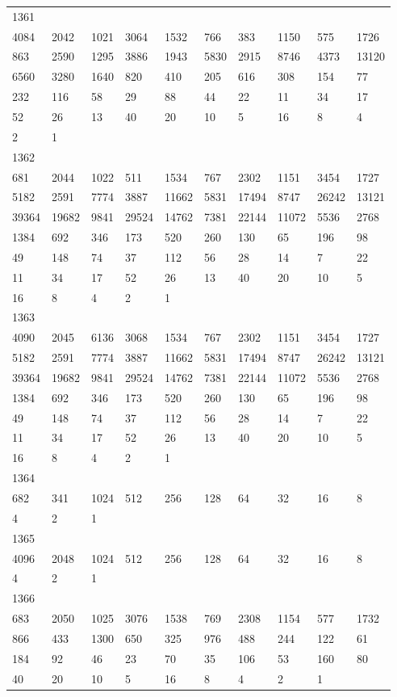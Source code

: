 \begin{longtable}{*{10}{l}}
1361&&&&&&&&&\\
4084& 2042& 1021& 3064& 1532& 766& 383& 1150& 575& 1726\\
863& 2590& 1295& 3886& 1943& 5830& 2915& 8746& 4373& 13120\\
6560& 3280& 1640& 820& 410& 205& 616& 308& 154& 77\\
232& 116& 58& 29& 88& 44& 22& 11& 34& 17\\
52& 26& 13& 40& 20& 10& 5& 16& 8& 4\\
2& 1& \\

1362&&&&&&&&&\\
681& 2044& 1022& 511& 1534& 767& 2302& 1151& 3454& 1727\\
5182& 2591& 7774& 3887& 11662& 5831& 17494& 8747& 26242& 13121\\
39364& 19682& 9841& 29524& 14762& 7381& 22144& 11072& 5536& 2768\\
1384& 692& 346& 173& 520& 260& 130& 65& 196& 98\\
49& 148& 74& 37& 112& 56& 28& 14& 7& 22\\
11& 34& 17& 52& 26& 13& 40& 20& 10& 5\\
16& 8& 4& 2& 1& \\

1363&&&&&&&&&\\
4090& 2045& 6136& 3068& 1534& 767& 2302& 1151& 3454& 1727\\
5182& 2591& 7774& 3887& 11662& 5831& 17494& 8747& 26242& 13121\\
39364& 19682& 9841& 29524& 14762& 7381& 22144& 11072& 5536& 2768\\
1384& 692& 346& 173& 520& 260& 130& 65& 196& 98\\
49& 148& 74& 37& 112& 56& 28& 14& 7& 22\\
11& 34& 17& 52& 26& 13& 40& 20& 10& 5\\
16& 8& 4& 2& 1& \\

1364&&&&&&&&&\\
682& 341& 1024& 512& 256& 128& 64& 32& 16& 8\\
4& 2& 1& \\

1365&&&&&&&&&\\
4096& 2048& 1024& 512& 256& 128& 64& 32& 16& 8\\
4& 2& 1& \\

1366&&&&&&&&&\\
683& 2050& 1025& 3076& 1538& 769& 2308& 1154& 577& 1732\\
866& 433& 1300& 650& 325& 976& 488& 244& 122& 61\\
184& 92& 46& 23& 70& 35& 106& 53& 160& 80\\
40& 20& 10& 5& 16& 8& 4& 2& 1& \\


\end{longtable}
